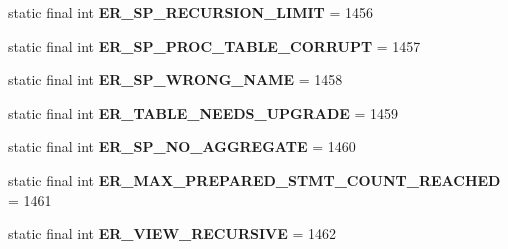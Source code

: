 \begin{DoxyCompactItemize}
\item 
\mbox{\label{classcom_1_1mysql_1_1cj_1_1exceptions_1_1_mysql_error_numbers_aeda8ad9f1f9e26295ff9b3c60337fbd5}} 
static final int {\bfseries E\+R\+\_\+\+S\+P\+\_\+\+R\+E\+C\+U\+R\+S\+I\+O\+N\+\_\+\+L\+I\+M\+IT} = 1456
\item 
\mbox{\label{classcom_1_1mysql_1_1cj_1_1exceptions_1_1_mysql_error_numbers_ad77a3c6a0b89da9dee33c540dff1c33d}} 
static final int {\bfseries E\+R\+\_\+\+S\+P\+\_\+\+P\+R\+O\+C\+\_\+\+T\+A\+B\+L\+E\+\_\+\+C\+O\+R\+R\+U\+PT} = 1457
\item 
\mbox{\label{classcom_1_1mysql_1_1cj_1_1exceptions_1_1_mysql_error_numbers_a51379b57edc67869864e6b9d0f7dba6b}} 
static final int {\bfseries E\+R\+\_\+\+S\+P\+\_\+\+W\+R\+O\+N\+G\+\_\+\+N\+A\+ME} = 1458
\item 
\mbox{\label{classcom_1_1mysql_1_1cj_1_1exceptions_1_1_mysql_error_numbers_a77278c86a67ff42228c86e40afa6917c}} 
static final int {\bfseries E\+R\+\_\+\+T\+A\+B\+L\+E\+\_\+\+N\+E\+E\+D\+S\+\_\+\+U\+P\+G\+R\+A\+DE} = 1459
\item 
\mbox{\label{classcom_1_1mysql_1_1cj_1_1exceptions_1_1_mysql_error_numbers_a9822dbcca17de488d5bf226860c4d498}} 
static final int {\bfseries E\+R\+\_\+\+S\+P\+\_\+\+N\+O\+\_\+\+A\+G\+G\+R\+E\+G\+A\+TE} = 1460
\item 
\mbox{\label{classcom_1_1mysql_1_1cj_1_1exceptions_1_1_mysql_error_numbers_ad780aa78efc53cbcc95d8be5788ca2d4}} 
static final int {\bfseries E\+R\+\_\+\+M\+A\+X\+\_\+\+P\+R\+E\+P\+A\+R\+E\+D\+\_\+\+S\+T\+M\+T\+\_\+\+C\+O\+U\+N\+T\+\_\+\+R\+E\+A\+C\+H\+ED} = 1461
\item 
\mbox{\label{classcom_1_1mysql_1_1cj_1_1exceptions_1_1_mysql_error_numbers_a2c838064d268f9f767f5dfc57b9afc07}} 
static final int {\bfseries E\+R\+\_\+\+V\+I\+E\+W\+\_\+\+R\+E\+C\+U\+R\+S\+I\+VE} = 1462

\end{DoxyCompactItemize}
